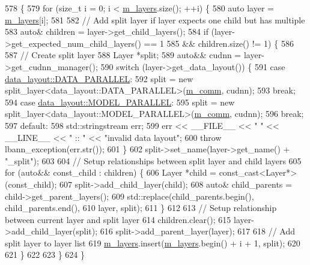 \begin{DoxyCode}
578                              \{
579   \textcolor{keywordflow}{for} (\textcolor{keywordtype}{size\_t} i = 0; i < \hyperlink{classlbann_1_1model_a0229fc226ec163d1411548446104569d}{m\_layers}.size(); ++i) \{
580     \textcolor{keyword}{auto} layer = \hyperlink{classlbann_1_1model_a0229fc226ec163d1411548446104569d}{m\_layers}[i];
581 
582     \textcolor{comment}{// Add split layer if layer expects one child but has multiple}
583     \textcolor{keyword}{auto}& children = layer->get\_child\_layers();
584     \textcolor{keywordflow}{if} (layer->get\_expected\_num\_child\_layers() == 1
585         && children.size() != 1) \{
586 
587       \textcolor{comment}{// Create split layer}
588       Layer *split;
589       \textcolor{keyword}{auto}&& cudnn = layer->get\_cudnn\_manager();
590       \textcolor{keywordflow}{switch} (layer->get\_data\_layout()) \{
591       \textcolor{keywordflow}{case} \hyperlink{base_8hpp_a786677cbfb3f5677b4d84f3056eb08dba37d2a3465f7cbf4ab60f4e79944d0638}{data\_layout::DATA\_PARALLEL}:
592         split = \textcolor{keyword}{new} split\_layer<data\_layout::DATA\_PARALLEL>(\hyperlink{classlbann_1_1model_a0eabaf2b2f829fd5db3dfd26df420df0}{m\_comm}, cudnn);
593         \textcolor{keywordflow}{break};
594       \textcolor{keywordflow}{case} \hyperlink{base_8hpp_a786677cbfb3f5677b4d84f3056eb08dbac94d7b0e44ab8bdcdad694a673cdeae0}{data\_layout::MODEL\_PARALLEL}:
595         split = \textcolor{keyword}{new} split\_layer<data\_layout::MODEL\_PARALLEL>(\hyperlink{classlbann_1_1model_a0eabaf2b2f829fd5db3dfd26df420df0}{m\_comm}, cudnn);
596         \textcolor{keywordflow}{break};
597       \textcolor{keywordflow}{default}:
598         std::stringstream err;
599         err << \_\_FILE\_\_ << \textcolor{stringliteral}{" "} << \_\_LINE\_\_ << \textcolor{stringliteral}{" :: "} << \textcolor{stringliteral}{"invalid data layout"};
600         \textcolor{keywordflow}{throw} lbann\_exception(err.str());
601       \}
602       split->set\_name(layer->get\_name() + \textcolor{stringliteral}{"\_split"});
603 
604       \textcolor{comment}{// Setup relationships between split layer and child layers}
605       \textcolor{keywordflow}{for} (\textcolor{keyword}{auto}&& const\_child : children) \{
606         Layer *child = \textcolor{keyword}{const\_cast<}Layer*\textcolor{keyword}{>}(const\_child);
607         split->add\_child\_layer(child);
608         \textcolor{keyword}{auto}& child\_parents = child->get\_parent\_layers();
609         std::replace(child\_parents.begin(), child\_parents.end(),
610                      layer, split);
611       \}
612 
613       \textcolor{comment}{// Setup relationship between current layer and split layer}
614       children.clear();
615       layer->add\_child\_layer(split);
616       split->add\_parent\_layer(layer);
617 
618       \textcolor{comment}{// Add split layer to layer list}
619       \hyperlink{classlbann_1_1model_a0229fc226ec163d1411548446104569d}{m\_layers}.insert(\hyperlink{classlbann_1_1model_a0229fc226ec163d1411548446104569d}{m\_layers}.begin() + i + 1, split);
620 
621     \}
622 
623   \}
624 \}
\end{DoxyCode}
